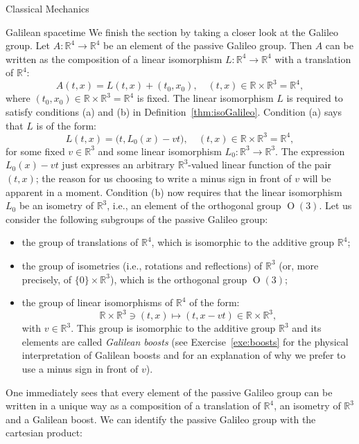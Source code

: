 \documentclass[oneside,a4paper,11pt]{amsbook}
\newcommand{\R}{\mathds R}
\DeclareMathOperator{\Or}{O}
\theoremstyle{remark}\newtheorem{exercise}{Exercise}[chapter]
\theoremstyle{plain}\newtheorem{teo}{Theorem}[section]
\theoremstyle{plain}\newtheorem{lem}[teo]{Lemma}
\theoremstyle{plain}\newtheorem{prop}[teo]{Proposition}
\theoremstyle{plain}\newtheorem{cor}[teo]{Corollary}
\theoremstyle{definition}\newtheorem{defin}[teo]{Definition}
\theoremstyle{remark}\newtheorem{rem}[teo]{Remark}
\theoremstyle{definition}\newtheorem{notation}[teo]{Notation}
\theoremstyle{definition}\newtheorem{convention}[teo]{Convention}
\theoremstyle{definition}\newtheorem{example}[teo]{Example}
\numberwithin{section}{chapter}
\numberwithin{equation}{section}
\begin{document}
\begin{chapter}{Classical Mechanics}
\begin{section}{Galilean spacetime}
We finish the section by taking a closer look at the Galileo group. Let $A:\R^4\to\R^4$ be an element of the passive
Galileo group. Then $A$ can be written as the composition of a linear isomorphism $L:\R^4\to\R^4$ with a translation
of $\R^4$:
\begin{equation}\label{eq:defAtx}
A(t,x)=L(t,x)+(t_0,x_0),\quad(t,x)\in\R\times\R^3=\R^4,
\end{equation}
where $(t_0,x_0)\in\R\times\R^3=\R^4$ is fixed. The linear isomorphism $L$ is required to satisfy conditions (a) and (b) in
Definition~\ref{thm:isoGalileo}. Condition (a) says that $L$ is of the form:
\begin{equation}\label{eq:defLtx}
L(t,x)=\big(t,L_0(x)-vt\big),\quad(t,x)\in\R\times\R^3=\R^4,
\end{equation}
for some fixed $v\in\R^3$ and some linear isomorphism $L_0:\R^3\to\R^3$. The expression $L_0(x)-vt$
just expresses an arbitrary $\R^3$-valued linear function of the pair $(t,x)$; the reason for us choosing
to write a minus sign in front of $v$ will be apparent in a moment. Condition
(b) now requires that the linear isomorphism $L_0$ be an isometry of $\R^3$, i.e., an element of the orthogonal group
$\Or(3)$. Let us consider the following subgroups of the passive Galileo group:
\begin{itemize}
\item the group of translations of $\R^4$, which is isomorphic to the additive group $\R^4$;
\item the group of isometries (i.e., rotations and reflections) of $\R^3$ (or, more precisely,
of $\{0\}\times\R^3$), which is the orthogonal group $\Or(3)$;
\item the group of linear isomorphisms of $\R^4$ of the form:
\begin{equation}\label{eq:boostv}
\R\times\R^3\ni(t,x)\longmapsto(t,x-vt)\in\R\times\R^3,
\end{equation}
with $v\in\R^3$. This group is isomorphic to the additive group $\R^3$ and its elements are called {\em Galilean boosts\/}
(see Exercise~\ref{exe:boosts} for the physical interpretation of Galilean boosts and for an explanation of why we prefer to use
a minus sign in front of $v$).
\end{itemize}
One immediately sees that every element of the passive Galileo group can be written in a unique way as a composition
of a translation of $\R^4$, an isometry of $\R^3$ and a Galilean boost. We can identify the passive Galileo group
with the cartesian product:
\begin{equation}\label{eq:identifyGalileo}

\end{equation}
\end{section}
\end{chapter}
\end{document}

